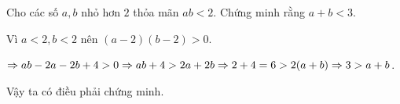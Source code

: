 \begin{problem}
	Cho các số $a, b$ nhỏ hơn $2$ thỏa mãn $ab < 2$. Chứng minh rằng $a + b < 3$.

	\solution

	Vì $a < 2, b < 2$ nên $(a - 2)(b - 2) > 0$.

	$\Rightarrow ab - 2a - 2b + 4 > 0 \\ \Rightarrow ab + 4 > 2a + 2b \\ \Rightarrow 2 + 4 = 6 > 2(a + b) \Rightarrow 3 > a + b$.

	Vậy ta có điều phải chứng minh.
\end{problem}


